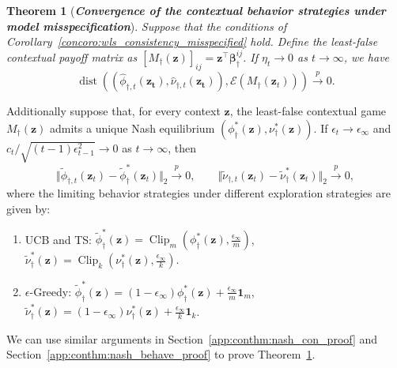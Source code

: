 \documentclass[12pt]{article}
\newtheorem{theorem}{Theorem}
\begin{document}
\begin{theorem}[\textbf{\emph{Convergence of the contextual behavior strategies under model misspecification}}]
\label{conthm:behavior_misspecified}
Suppose that the conditions of Corollary~\ref{concoro:wls_consistency_misspecified} hold. Define the least-false contextual payoff matrix as $[M_\dagger(\bm z)]_{ij}=\bm z^\top\bm\beta_\dagger^{ij}$. If $\eta_t\to 0$ as $t \to \infty$, we have
\begin{equation*}
    \operatorname{dist} \left( (\widehat{\phi}_{\dagger,t}(\bm{z_t}), \widehat{\nu}_{\dagger,t}(\bm{z_t})),\mathcal{E}(M_{\dagger}(\bm{z}_t)) \right) \stackrel{p}{\to} 0.
    \end{equation*}
\end{theorem}
Additionally suppose that, for every context $\bm z$, the least-false contextual game $M_\dagger(\bm z)$ admits a unique Nash equilibrium $\left(\phi_\dagger^\ast(\bm z),\nu_\dagger^\ast(\bm z)\right)$.
If $\epsilon_t\to\epsilon_\infty$ and $c_t/\sqrt{(t-1)\epsilon_{t-1}^2} \to 0$ as $t \to \infty$, then
\[
\Vert
\widetilde{\phi}_{\dagger,t}(\bm z_t) - \widetilde{\phi}_\dagger^{\ast}(\bm z_t)
\Vert_2
\stackrel{p}{\to} 0,
\qquad
\Vert
\widetilde{\nu}_{\dagger,t}(\bm z_t) - \widetilde{\nu}_\dagger^{\ast}(\bm z_t)
\Vert_2
\stackrel{p}{\to} 0,
\]
where the limiting behavior strategies under different exploration
strategies are given by:
\begin{enumerate}
    \item[\textnormal{(1)}] UCB and TS:
    $\widetilde{\phi}_\dagger^{\ast}(\bm z) =
    \operatorname{Clip}_{m}
    \left(
    \phi_\dagger^\ast(\bm z),
    \frac{\epsilon_\infty}{m}
    \right)$,
    $\widetilde{\nu}_\dagger^{\ast}(\bm z) =
    \operatorname{Clip}_{k}
    \left(
    \nu_\dagger^\ast(\bm z),
    \frac{\epsilon_\infty}{k}
    \right)$.
    \item[\textnormal{(2)}] $\epsilon$-Greedy:
    $\widetilde{\phi}_\dagger^{\ast}(\bm z) =
    (1-\epsilon_\infty)\phi_\dagger^\ast(\bm z)
    + \frac{\epsilon_\infty}{m}\bm 1_m$,
    $\widetilde{\nu}_\dagger^{\ast}(\bm z) =
    (1-\epsilon_\infty)\nu_\dagger^\ast(\bm z)
    + \frac{\epsilon_\infty}{k}\bm 1_k$.
\end{enumerate}
We can use similar arguments in Section~\ref{app:conthm:nash_con_proof} and Section~\ref{app:conthm:nash_behave_proof} to prove Theorem~\ref{conthm:behavior_misspecified}. 
\end{document}
